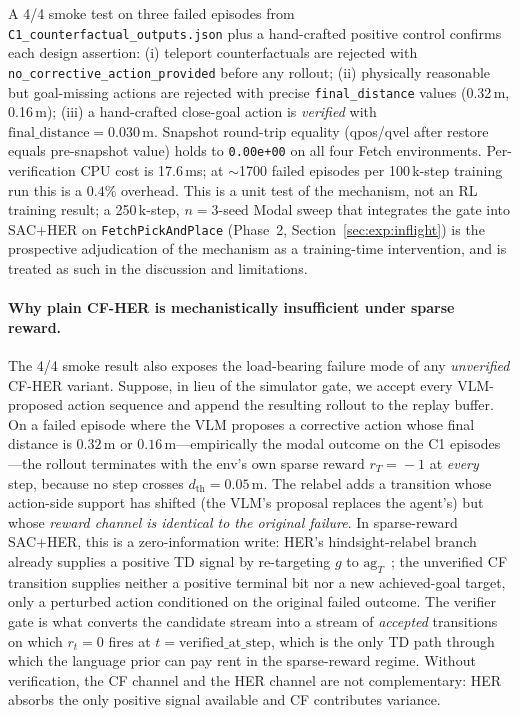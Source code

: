 \documentclass{article}
\begin{document}
A 4/4 smoke test on three failed episodes from
\texttt{C1\_counterfactual\_outputs.json} plus a hand-crafted positive control
confirms each design assertion: (i) teleport counterfactuals are rejected with
\texttt{no\_corrective\_action\_provided} before any rollout; (ii) physically
reasonable but goal-missing actions are rejected with precise
\texttt{final\_distance} values (0.32\,m, 0.16\,m); (iii) a hand-crafted close-goal
action is \emph{verified} with $\text{final\_distance}\!=\!0.030$\,m. Snapshot
round-trip equality (qpos/qvel after restore equals pre-snapshot value) holds to
\texttt{0.00e+00} on all four Fetch environments. Per-verification CPU cost is
17.6\,ms; at $\sim$1700 failed episodes per 100\,k-step training run this is a
$0.4\%$ overhead. This is a unit test of the mechanism, not an RL training
result; a 250\,k-step, $n\!=\!3$-seed Modal sweep that integrates the gate
into SAC+HER on \texttt{FetchPickAndPlace} (Phase~2,
Section~\ref{sec:exp:inflight}) is the prospective adjudication of the
mechanism as a training-time intervention, and is treated as such in the
discussion and limitations.

\paragraph{Why plain CF-HER is mechanistically insufficient under sparse reward.}
The 4/4 smoke result also exposes the load-bearing failure mode of any
\emph{unverified} CF-HER variant. Suppose, in lieu of the simulator gate,
we accept every VLM-proposed action sequence and append the resulting rollout
to the replay buffer. On a failed episode where the VLM proposes a corrective
action whose final distance is $0.32$\,m or $0.16$\,m---empirically the modal
outcome on the C1 episodes---the rollout terminates with the env's own sparse
reward $r_T\!=\!-1$ at \emph{every} step, because no step crosses
$d_{\text{th}}\!=\!0.05$\,m. The relabel adds a transition whose action-side
support has shifted (the VLM's proposal replaces the agent's) but whose
\emph{reward channel is identical to the original failure}. In sparse-reward
SAC+HER, this is a zero-information write: HER's hindsight-relabel branch
already supplies a positive TD signal by re-targeting $g$ to
$\text{ag}_T$~\citep{andrychowicz2017her}; the unverified CF transition
supplies neither a positive terminal bit nor a new achieved-goal target, only
a perturbed action conditioned on the original failed outcome. The verifier
gate is what converts the candidate stream into a stream of \emph{accepted}
transitions on which $r_t\!=\!0$ fires at $t\!=\!\text{verified\_at\_step}$,
which is the only TD path through which the language prior can pay rent in
the sparse-reward regime. Without verification, the CF channel and the HER
channel are not complementary: HER absorbs the only positive signal available
and CF contributes variance.
\end{document}
